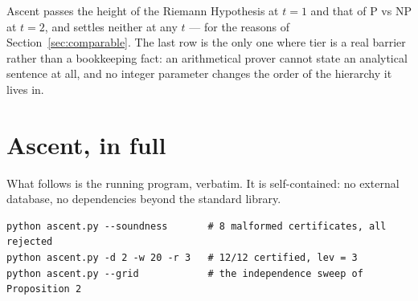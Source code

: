 \documentclass[11pt,a4paper]{article}
\begin{document}
Ascent passes the height of the Riemann Hypothesis at $t=1$ and that of P vs NP
at $t=2$, and settles neither at any $t$ --- for the reasons of
Section~\ref{sec:comparable}. The last row is the only one where tier is a
real barrier rather than a bookkeeping fact: an arithmetical prover cannot
state an analytical sentence at all, and no integer parameter changes the
order of the hierarchy it lives in.

\section{Ascent, in full}\label{app:code}

What follows is the running program, verbatim. It is self-contained: no
external database, no dependencies beyond the standard library.

\begin{verbatim}
python ascent.py --soundness       # 8 malformed certificates, all rejected
python ascent.py -d 2 -w 20 -r 3   # 12/12 certified, lev = 3
python ascent.py --grid            # the independence sweep of Proposition 2
\end{verbatim}


\end{document}
